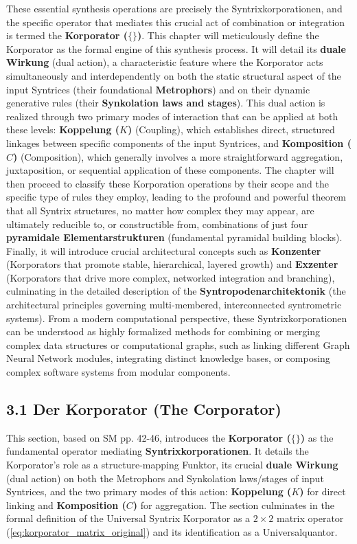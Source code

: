 \documentclass[12pt]{article}
\begin{document}
These essential synthesis operations are precisely the Syntrixkorporationen, and the specific operator that mediates this crucial act of combination or integration is termed the \textbf{Korporator (\( \{ \} \))}. This chapter will meticulously define the Korporator as the formal engine of this synthesis process. It will detail its \textbf{duale Wirkung} (dual action), a characteristic feature where the Korporator acts simultaneously and interdependently on both the static structural aspect of the input Syntrices (their foundational \textbf{Metrophors}) and on their dynamic generative rules (their \textbf{Synkolation laws and stages}). This dual action is realized through two primary modes of interaction that can be applied at both these levels: \textbf{Koppelung (\( K \))} (Coupling), which establishes direct, structured linkages between specific components of the input Syntrices, and \textbf{Komposition (\( C \))} (Composition), which generally involves a more straightforward aggregation, juxtaposition, or sequential application of these components. The chapter will then proceed to classify these Korporation operations by their scope and the specific type of rules they employ, leading to the profound and powerful theorem that all Syntrix structures, no matter how complex they may appear, are ultimately reducible to, or constructible from, combinations of just four \textbf{pyramidale Elementarstrukturen} (fundamental pyramidal building blocks). Finally, it will introduce crucial architectural concepts such as \textbf{Konzenter} (Korporators that promote stable, hierarchical, layered growth) and \textbf{Exzenter} (Korporators that drive more complex, networked integration and branching), culminating in the detailed description of the \textbf{Syntropodenarchitektonik} (the architectural principles governing multi-membered, interconnected syntrometric systems). From a modern computational perspective, these Syntrixkorporationen can be understood as highly formalized methods for combining or merging complex data structures or computational graphs, such as linking different Graph Neural Network modules, integrating distinct knowledge bases, or composing complex software systems from modular components.

\subsection{3.1 Der Korporator (The Corporator)}
\label{sec:korporator}

This section, based on SM pp. 42-46, introduces the \textbf{Korporator (\( \{ \} \))} as the fundamental operator mediating \textbf{Syntrixkorporationen}. It details the Korporator's role as a structure-mapping Funktor, its crucial \textbf{duale Wirkung} (dual action) on both the Metrophors and Synkolation laws/stages of input Syntrices, and the two primary modes of this action: \textbf{Koppelung (\(K\))} for direct linking and \textbf{Komposition (\(C\))} for aggregation. The section culminates in the formal definition of the Universal Syntrix Korporator as a \(2 \times 2\) matrix operator (\eqref{eq:korporator_matrix_original}) and its identification as a Universalquantor.
\end{document}
